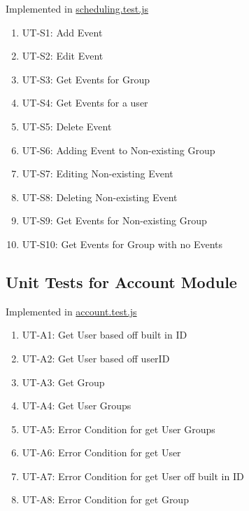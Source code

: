 \documentclass[12pt, titlepage]{article}
\begin{document}
Implemented in \href{https://github.com/DangJustin/CapstoneProject/blob/main/src/rev0_demo/server/tests/scheduling.test.js}{scheduling.test.js}

\begin{enumerate}
    \item UT-S1: Add Event
    \item UT-S2: Edit Event
    \item UT-S3: Get Events for Group
    \item UT-S4: Get Events for a user
    \item UT-S5: Delete Event
    \item UT-S6: Adding Event to Non-existing Group
    \item UT-S7: Editing Non-existing Event
    \item UT-S8: Deleting Non-existing Event
    \item UT-S9: Get Events for Non-existing Group
    \item UT-S10: Get Events for Group with no Events
\end{enumerate}


\subsection{Unit Tests for Account Module}

Implemented in \href{https://github.com/DangJustin/CapstoneProject/blob/main/src/rev0_demo/server/tests/account.test.js}{account.test.js}

\begin{enumerate}
    \item UT-A1: Get User based off built in ID
    \item UT-A2: Get User based off userID
    \item UT-A3: Get Group
    \item UT-A4: Get User Groups
    \item UT-A5: Error Condition for get User Groups
    \item UT-A6: Error Condition for get User
    \item UT-A7: Error Condition for get User off built in ID
    \item UT-A8: Error Condition for get Group
\end{enumerate}


\end{document}
